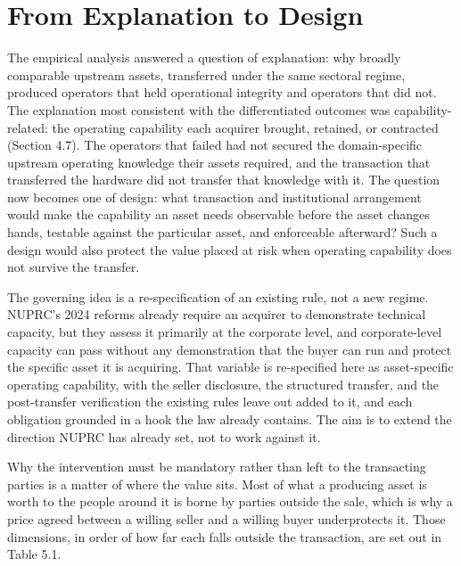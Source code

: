 \documentclass[twoside,fontset=lmodern]{mitthesis}
\begin{document}
\hypertarget{from-explanation-to-design}{%
\section{From Explanation to Design}\label{from-explanation-to-design}}

The empirical analysis answered a question of explanation: why broadly
comparable upstream assets, transferred under the same sectoral regime,
produced operators that held operational integrity and operators that
did not. The explanation most consistent with the differentiated
outcomes was capability-related: the operating capability each acquirer
brought, retained, or contracted (Section 4.7). The operators that
failed had not secured the domain-specific upstream operating knowledge
their assets required, and the transaction that transferred the hardware
did not transfer that knowledge with it. The question now becomes one of
design: what transaction and institutional arrangement would make the
capability an asset needs observable before the asset changes hands,
testable against the particular asset, and enforceable afterward? Such a
design would also protect the value placed at risk when operating
capability does not survive the transfer.

The governing idea is a re-specification of an existing rule, not a new
regime. NUPRC's 2024 reforms already require an acquirer to demonstrate
technical capacity, but they assess it primarily at the corporate level,
and corporate-level capacity can pass without any demonstration that the
buyer can run and protect the specific asset it is acquiring. That
variable is re-specified here as asset-specific operating capability,
with the seller disclosure, the structured transfer, and the
post-transfer verification the existing rules leave out added to it, and
each obligation grounded in a hook the law already contains. The aim is
to extend the direction NUPRC has already set, not to work against it.

Why the intervention must be mandatory rather than left to the
transacting parties is a matter of where the value sits. Most of what a
producing asset is worth to the people around it is borne by parties
outside the sale, which is why a price agreed between a willing seller
and a willing buyer underprotects it. Those dimensions, in order of how
far each falls outside the transaction, are set out in Table 5.1.
\end{document}
